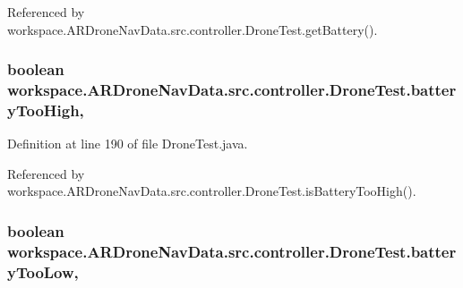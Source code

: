 Referenced by workspace.\+A\+R\+Drone\+Nav\+Data.\+src.\+controller.\+Drone\+Test.\+get\+Battery().

\hypertarget{classworkspace_1_1_a_r_drone_nav_data_1_1src_1_1controller_1_1_drone_test_abdb1f6373dd5ba50c123949a0b708a31}{}
\subsubsection[{battery\+Too\+High}]{\setlength{\rightskip}{0pt plus 5cm}boolean workspace.\+A\+R\+Drone\+Nav\+Data.\+src.\+controller.\+Drone\+Test.\+battery\+Too\+High\hspace{0.3cm}{\ttfamily [static]}, {\ttfamily [protected]}}\label{classworkspace_1_1_a_r_drone_nav_data_1_1src_1_1controller_1_1_drone_test_abdb1f6373dd5ba50c123949a0b708a31}


Definition at line 190 of file Drone\+Test.\+java.



Referenced by workspace.\+A\+R\+Drone\+Nav\+Data.\+src.\+controller.\+Drone\+Test.\+is\+Battery\+Too\+High().

\hypertarget{classworkspace_1_1_a_r_drone_nav_data_1_1src_1_1controller_1_1_drone_test_a5f76b3b60db9c8485a15174b4012f95f}{}
\subsubsection[{battery\+Too\+Low}]{\setlength{\rightskip}{0pt plus 5cm}boolean workspace.\+A\+R\+Drone\+Nav\+Data.\+src.\+controller.\+Drone\+Test.\+battery\+Too\+Low\hspace{0.3cm}{\ttfamily [static]}, {\ttfamily [protected]}}\label{classworkspace_1_1_a_r_drone_nav_data_1_1src_1_1controller_1_1_drone_test_a5f76b3b60db9c8485a15174b4012f95f}


